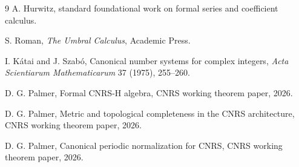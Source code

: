 \documentclass[11pt]{article}
\begin{document}
\begin{thebibliography}{9}
A. Hurwitz,
standard foundational work on formal series and coefficient calculus.

S. Roman,
\emph{The Umbral Calculus},
Academic Press.

I. K\'atai and J. Szab\'o,
Canonical number systems for complex integers,
\emph{Acta Scientiarum Mathematicarum} 37 (1975), 255--260.

D. G. Palmer,
Formal CNRS-H algebra,
CNRS working theorem paper, 2026.

D. G. Palmer,
Metric and topological completeness in the CNRS architecture,
CNRS working theorem paper, 2026.

D. G. Palmer,
Canonical periodic normalization for CNRS,
CNRS working theorem paper, 2026.
\end{thebibliography}
\end{document}
